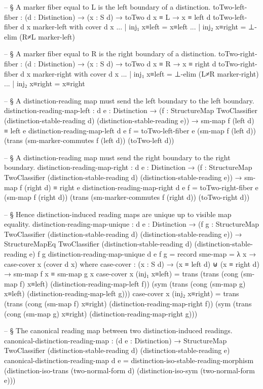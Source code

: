 \documentclass[11pt]{article}
\begin{document}
\begin{code}
-- § A marker fiber equal to L is the left boundary of a distinction.
toTwo-left-fiber :
  (d : Distinction) →
  (x : S d) →
  toTwo d x ≡ L →
  x ≡ left d
toTwo-left-fiber d x marker-left with cover d x
... | inj₁ x≡left = x≡left
... | inj₂ x≡right =
  ⊥-elim (R≠L marker-left)

-- § A marker fiber equal to R is the right boundary of a distinction.
toTwo-right-fiber :
  (d : Distinction) →
  (x : S d) →
  toTwo d x ≡ R →
  x ≡ right d
toTwo-right-fiber d x marker-right with cover d x
... | inj₁ x≡left =
  ⊥-elim (L≠R marker-right)
... | inj₂ x≡right = x≡right

-- § A distinction-reading map must send the left boundary to the left boundary.
distinction-reading-map-left :
  {d e : Distinction} →
  (f : StructureMap TwoClassifier
        (distinction-stable-reading d)
        (distinction-stable-reading e)) →
  sm-map f (left d) ≡ left e
distinction-reading-map-left {d} {e} f =
  toTwo-left-fiber e (sm-map f (left d))
    (trans (sm-marker-commutes f (left d)) (toTwo-left d))

-- § A distinction-reading map must send the right boundary to the right boundary.
distinction-reading-map-right :
  {d e : Distinction} →
  (f : StructureMap TwoClassifier
        (distinction-stable-reading d)
        (distinction-stable-reading e)) →
  sm-map f (right d) ≡ right e
distinction-reading-map-right {d} {e} f =
  toTwo-right-fiber e (sm-map f (right d))
    (trans (sm-marker-commutes f (right d)) (toTwo-right d))

-- § Hence distinction-induced reading maps are unique up to visible map equality.
distinction-reading-map-unique :
  {d e : Distinction} →
  (f g : StructureMap TwoClassifier
          (distinction-stable-reading d)
          (distinction-stable-reading e)) →
  StructureMapEq TwoClassifier
    (distinction-stable-reading d)
    (distinction-stable-reading e)
    f g
distinction-reading-map-unique {d} {e} f g = record
  { sme-map = λ x →
      case-cover x (cover d x)
  }
  where
    case-cover :
      (x : S d) →
      (x ≡ left d) ⊎ (x ≡ right d) →
      sm-map f x ≡ sm-map g x
    case-cover x (inj₁ x≡left) =
      trans
        (trans (cong (sm-map f) x≡left) (distinction-reading-map-left f))
        (sym
          (trans (cong (sm-map g) x≡left) (distinction-reading-map-left g)))
    case-cover x (inj₂ x≡right) =
      trans
        (trans (cong (sm-map f) x≡right) (distinction-reading-map-right f))
        (sym
          (trans (cong (sm-map g) x≡right) (distinction-reading-map-right g)))

-- § The canonical reading map between two distinction-induced readings.
canonical-distinction-reading-map :
  (d e : Distinction) →
  StructureMap TwoClassifier
    (distinction-stable-reading d)
    (distinction-stable-reading e)
canonical-distinction-reading-map d e =
  distinction-iso-stable-reading-morphism
    (distinction-iso-trans
      (two-normal-form d)
      (distinction-iso-sym (two-normal-form e)))
\end{code}
\end{document}
